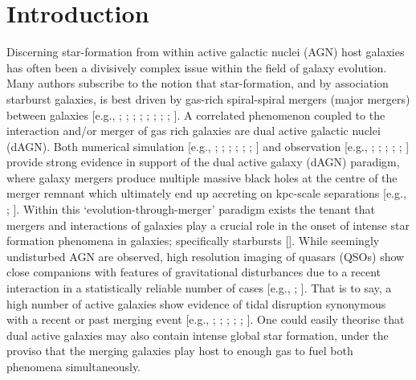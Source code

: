 \section{Introduction}

Discerning star-formation from within active galactic nuclei (AGN) host galaxies has often been a divisively complex issue within the field of galaxy evolution. Many authors subscribe to the notion that star-formation, and by association starburst galaxies, is best driven by gas-rich spiral-spiral mergers (major mergers) between galaxies [e.g., \cite{thews_Neugebauer_Scoville_1988}; \cite{Mihos_Hernquist_1996}; \cite{1997AA...326..537D}; \cite{Barton_Geller_Kenyon_2000}; \cite{Tissera_Dominguez-Tenreiro_Scannapieco_Saiz_2002}; \cite{2005A&A...438...87K}; \cite{Narayanan_Groppi_Kulesa_Walker_2005}; \cite{Narayanan_Hayward_Murray_2013}; \cite{Scott_Kaviraj_2013}]. A correlated phenomenon coupled to the interaction and/or merger of gas rich galaxies are dual active galactic nuclei (dAGN). Both numerical simulation [e.g., \cite{Hoffman_Loeb_2007}; \cite{a_Eichhorn_Makino_Spurzem_2010}; \cite{Shen_2010}; \cite{Yu_2011}; \cite{2013MNRAS.429.2594B}; \cite{Kulkarni_Loeb_2012}; \cite{Van_Wassenhove_2014}] and observation [e.g., \cite{ice_Ivison_Lin_Koo_et_al__2007}; \cite{2009ApJ...702L..82C}; \cite{ario_Shields_Smith_Wright_2011}; \cite{nen_Chapman_Bonning_Chiba_2012}; \cite{Barrows_2013}; \cite{Huang_2014}] provide strong evidence in support of the dual active galaxy (dAGN) paradigm, where galaxy mergers produce multiple massive black holes at the centre of the merger remnant which ultimately end up accreting on kpc-scale separations [e.g., \cite{Liu_Greene_Shen_Strauss_2010}; \cite{obel_Comerford_Middelberg_2014}].  Within this `evolution-through-merger' paradigm exists the tenant that mergers and interactions of galaxies play a crucial role in the onset of intense star formation phenomena in galaxies; specifically starbursts [\cite{1984MNRAS.209..111J}]. While seemingly undisturbed AGN are observed, high resolution imaging of quasars (QSOs) show close companions with features of gravitational disturbances due to a recent interaction in a statistically reliable number of cases [e.g., \cite{Bahcall_Kirhakos_Saxe_Schneider_1997}; \cite{Bennert_2008}]. That is to say, a high number of active galaxies show evidence of tidal disruption synonymous with a recent or past merging event [e.g., \cite{Sanders_1988}; \cite{Hutchings_1988}; \cite{Graham_1990}; \cite{Keel_1996}; \cite{Schmitt_2001}; \cite{Alonso_2007}]. One could easily theorise that dual active galaxies may also contain intense global star formation, under the proviso that the merging galaxies play host to enough gas to fuel both phenomena simultaneously.  

